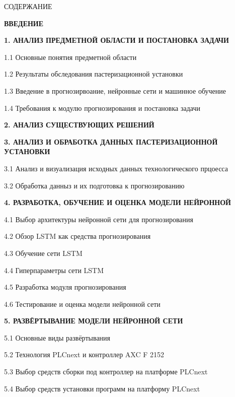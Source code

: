 {\gostTitleFont
    \redline
    СОДЕРЖАНИЕ
} 

\titlespace

{\gostFont

    \par {\bfseries ВВЕДЕНИЕ }
    \par {\bfseries 1. АНАЛИЗ ПРЕДМЕТНОЙ ОБЛАСТИ И ПОСТАНОВКА ЗАДАЧИ }
    \par 1.1 Основные понятия предметной области 
    \par 1.2 Результаты обследования пастеризационной установки  
    \par 1.3 Введение в прогнозирвоание, нейронные сети и машинное обучение  
    \par 1.4 Требования к модулю прогнозирования и постановка задачи  
    \par {\bfseries 2. АНАЛИЗ СУЩЕСТВУЮЩИХ РЕШЕНИЙ }
    \par {\bfseries 3. АНАЛИЗ И ОБРАБОТКА ДАННЫХ ПАСТЕРИЗАЦИОННОЙ УСТАНОВКИ }
    \par 3.1 Анализ и визуализация исходных данных технологического прцоесса 
    \par 3.2 Обработка данныз и их подготовка к прогнозированию 
    \par {\bfseries 4. РАЗРАБОТКА, ОБУЧЕНИЕ И ОЦЕНКА МОДЕЛИ НЕЙРОННОЙ }
    \par 4.1 Выбор архитектуры нейронной сети для прогнозирования 
    \par 4.2 Обзор LSTM как средства прогнозирования 
    \par 4.3 Обучение сети LSTM 
    \par 4.4 Гиперпараметры сети LSTM 
    \par 4.5 Разработка модуля прогнозирования 
    \par 4.6 Тестирование и оценка модели нейронной сети 
    \par {\bfseries 5. РАЗВЁРТЫВАНИЕ МОДЕЛИ НЕЙРОННОЙ СЕТИ }
    \par 5.1 Основные виды развёртывания 
    \par 5.2 Технология PLCnext и контроллер AXC F 2152 
    \par 5.3 Выбор средств сборки под контроллер на платформе PLCnext 
    \par 5.4 Выбор средств установки программ на платформу PLCnext 
}
